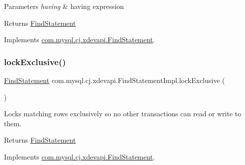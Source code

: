 \begin{DoxyParams}{Parameters}
{\em having} & having expression \\
\hline
\end{DoxyParams}
\begin{DoxyReturn}{Returns}
\mbox{\hyperlink{interfacecom_1_1mysql_1_1cj_1_1xdevapi_1_1_find_statement}{Find\+Statement}} 
\end{DoxyReturn}


Implements \mbox{\hyperlink{interfacecom_1_1mysql_1_1cj_1_1xdevapi_1_1_find_statement_af151c43e0c862bd983c6c737320a6a5f}{com.\+mysql.\+cj.\+xdevapi.\+Find\+Statement}}.

\mbox{\label{classcom_1_1mysql_1_1cj_1_1xdevapi_1_1_find_statement_impl_a3486c67a7e4b354ff3101b9c5734c5f1}} 
\subsubsection{\texorpdfstring{lock\+Exclusive()}{lockExclusive()}\hspace{0.1cm}{\footnotesize\ttfamily [1/2]}}
{\footnotesize\ttfamily \mbox{\hyperlink{interfacecom_1_1mysql_1_1cj_1_1xdevapi_1_1_find_statement}{Find\+Statement}} com.\+mysql.\+cj.\+xdevapi.\+Find\+Statement\+Impl.\+lock\+Exclusive (\begin{DoxyParamCaption}{ }\end{DoxyParamCaption})}

Locks matching rows exclusively so no other transactions can read or write to them.

\begin{DoxyReturn}{Returns}
\mbox{\hyperlink{interfacecom_1_1mysql_1_1cj_1_1xdevapi_1_1_find_statement}{Find\+Statement}} 
\end{DoxyReturn}


Implements \mbox{\hyperlink{interfacecom_1_1mysql_1_1cj_1_1xdevapi_1_1_find_statement_af7d8cbf89d9c5c6caf6c0d89490b5d06}{com.\+mysql.\+cj.\+xdevapi.\+Find\+Statement}}.

\mbox{\label{classcom_1_1mysql_1_1cj_1_1xdevapi_1_1_find_statement_impl_abb488a09f4ad595edcb2725712182e38}} 
